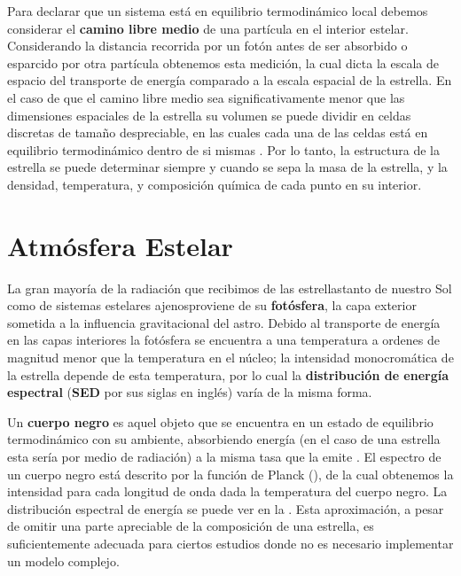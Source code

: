 Para declarar que un sistema está en equilibrio termodinámico local debemos
considerar el \textbf{camino libre medio} de una partícula en el interior
estelar. Considerando la distancia recorrida por un fotón antes de ser absorbido
o esparcido por otra partícula obtenemos esta medición, la cual dicta la escala
de espacio del transporte de energía comparado a la escala espacial de la
estrella. En el caso de que el camino libre medio sea significativamente menor
que las dimensiones espaciales de la estrella su volumen se puede dividir en
celdas discretas de tamaño despreciable, en las cuales cada una de las celdas
está en equilibrio termodinámico dentro de si mismas
. Por lo tanto, la
estructura de la estrella se puede determinar siempre y cuando se sepa la masa
de la estrella, y la densidad, temperatura, y composición química de cada punto
en su interior.

\section{Atmósfera Estelar}

La gran mayoría de la radiación que recibimos de las estrellas\textemdash tanto
de nuestro Sol como de sistemas estelares ajenos\textemdash proviene de su
\textbf{fotósfera}, la capa exterior sometida a la influencia gravitacional del
astro. Debido al transporte de energía en las capas interiores la fotósfera
se encuentra a una temperatura a ordenes de magnitud menor que la temperatura en
el núcleo; la intensidad monocromática de la estrella depende de esta
temperatura, por lo cual la \textbf{distribución de energía espectral}
(\textbf{SED} por sus siglas en inglés) varía de la misma forma. %

Un \textbf{cuerpo negro} es aquel objeto que se encuentra en un estado de
equilibrio termodinámico con su ambiente, absorbiendo energía (en el caso de una
estrella esta sería por medio de radiación) a la misma tasa que la emite
. El espectro de un cuerpo
negro está descrito por la función de Planck
(), de la cual obtenemos la intensidad para
cada longitud de onda dada la temperatura del cuerpo negro. La distribución
espectral de energía se puede ver en la .
Esta aproximación, a pesar de omitir una parte apreciable de la composición de
una estrella, es suficientemente adecuada para ciertos estudios donde no es
necesario implementar un modelo complejo.

